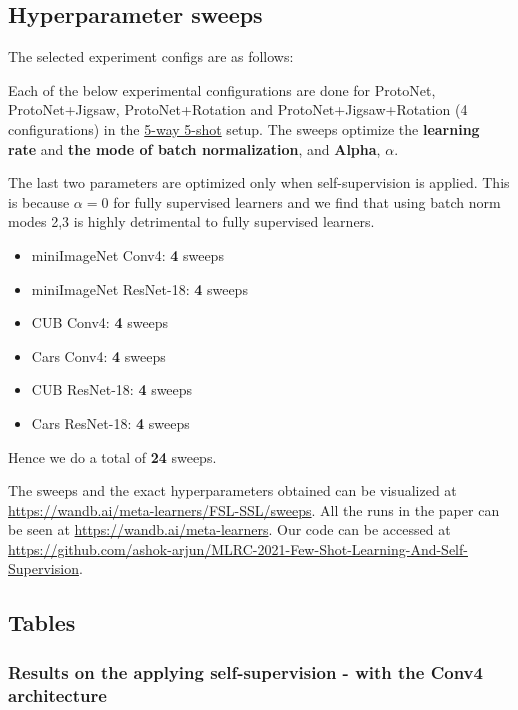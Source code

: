 \subsection{Hyperparameter sweeps}

The selected experiment configs are as follows:

Each of the below experimental configurations are done for ProtoNet, ProtoNet+Jigsaw, ProtoNet+Rotation and ProtoNet+Jigsaw+Rotation (4 configurations) in the \underline{5-way 5-shot} setup. The sweeps optimize the \textbf{learning rate} and \textbf{the mode of batch normalization}, and \textbf{Alpha}, $\alpha$. 

The last two parameters are optimized only when self-supervision is applied. This is because $\alpha=0$ for fully supervised learners and we find that using batch norm modes 2,3 is highly detrimental to fully supervised learners.

\begin{itemize}
\item miniImageNet Conv4: \textbf{4} sweeps
\item miniImageNet ResNet-18: \textbf{4} sweeps  
\item CUB Conv4: \textbf{4} sweeps
\item Cars Conv4: \textbf{4} sweeps
\item CUB ResNet-18: \textbf{4} sweeps
\item Cars ResNet-18: \textbf{4} sweeps
\end{itemize}

Hence we do a total of \textbf{24} sweeps.

The sweeps and the exact hyperparameters obtained can be visualized at \url{https://wandb.ai/meta-learners/FSL-SSL/sweeps}. All the runs in the paper can be seen at \url{https://wandb.ai/meta-learners}. Our code can be accessed at \url{https://github.com/ashok-arjun/MLRC-2021-Few-Shot-Learning-And-Self-Supervision}.


\subsection{Tables}

\subsubsection{Results on the applying self-supervision - with the Conv4 architecture}

